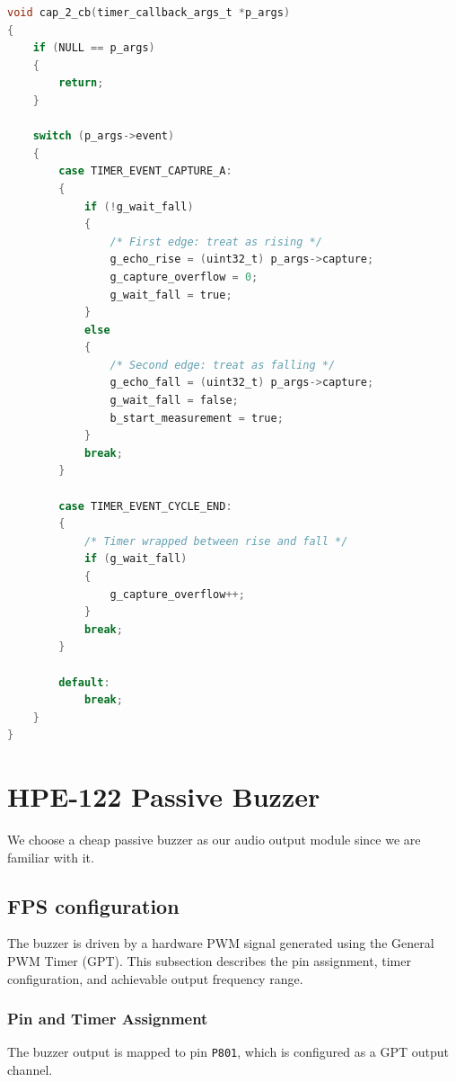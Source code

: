 \documentclass[12pt]{article}
\begin{document}
\begin{lstlisting}[language=C, caption={GPT2 Input Capture Callback for Echo Pulse Measurement}, label={lst:gpt2_callback}]
void cap_2_cb(timer_callback_args_t *p_args)
{
    if (NULL == p_args)
    {
        return;
    }

    switch (p_args->event)
    {
        case TIMER_EVENT_CAPTURE_A:
        {
            if (!g_wait_fall)
            {
                /* First edge: treat as rising */
                g_echo_rise = (uint32_t) p_args->capture;
                g_capture_overflow = 0;
                g_wait_fall = true;
            }
            else
            {
                /* Second edge: treat as falling */
                g_echo_fall = (uint32_t) p_args->capture;
                g_wait_fall = false;
                b_start_measurement = true;
            }
            break;
        }

        case TIMER_EVENT_CYCLE_END:
        {
            /* Timer wrapped between rise and fall */
            if (g_wait_fall)
            {
                g_capture_overflow++;
            }
            break;
        }

        default:
            break;
    }
}
\end{lstlisting}

\section{HPE-122 Passive Buzzer}
\label{subsec:buzzer}

We choose a cheap passive buzzer as our audio output module since we are familiar with it.

\subsection{FPS configuration}
The buzzer is driven by a hardware PWM signal generated using the General PWM Timer (GPT). This subsection describes the pin assignment, timer configuration, and achievable output frequency range.

\subsubsection{Pin and Timer Assignment}

The buzzer output is mapped to pin \texttt{P801}, which is configured as a GPT output channel.
\end{document}
